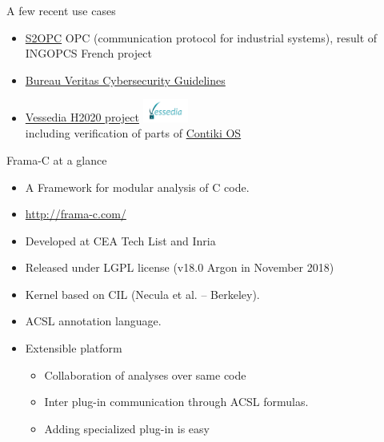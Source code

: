 \documentclass[pdf,xcolor={svgnames}]{beamer}
\begin{document}
\begin{frame}{A few recent use cases}
\begin{itemize}
\item \href{https://gitlab.com/systerel/S2OPC/}{S2OPC}
  OPC (communication protocol for industrial systems), result of INGOPCS
  French project
\item \href{https://www.bureauveritas.com/white-papers/cybersecurity-guidelines-for-development-and-assessment-bv-sw-200}{Bureau Veritas Cybersecurity Guidelines}
\item \href{https://www.vessedia.eu/}{Vessedia H2020 project} \includegraphics[align=c,width=1.5cm]{vessedia-logo}\\
including verification of parts of \href{http://www.contiki-os.org/}{Contiki OS}
\end{itemize}
\end{frame}

\begin{frame}{Frama-C at a glance}
\begin{itemize}
\item
  A \alert{Fra}mework for \alert{m}odular \alert{a}nalysis of \alert{C} code.
\item \url{http://frama-c.com/}
\item Developed at CEA Tech List and Inria
\item Released under LGPL license (v18.0 Argon in November 2018)
\item Kernel based on CIL (Necula et al. -- Berkeley).
\item ACSL annotation language.
\item Extensible platform
\begin{itemize}
\item Collaboration of analyses over same code
\item Inter plug-in communication through ACSL formulas.
\item Adding specialized plug-in is easy
\end{itemize}
\end{itemize}
\end{frame}
\end{document}
